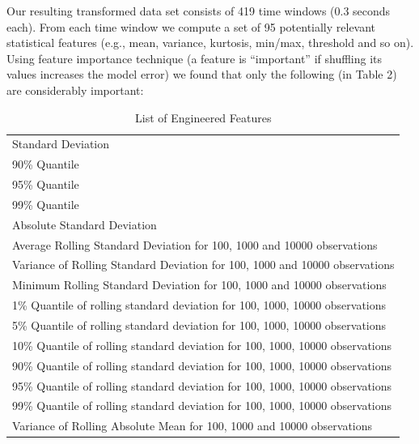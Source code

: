 \documentclass[]{llncs} %
\begin{document}
Our resulting transformed data set consists of 419 time windows (0.3 seconds each).  From each time window we compute a set of 95 potentially relevant statistical features (e.g., mean, variance, kurtosis, min/max, threshold and so on). Using feature importance technique (a feature is “important” if shuffling its values increases the model error) we found that only the following (in Table 2) are considerably important:
\begin{table}[H]
	\begin{center}
		\caption{List of Engineered Features}
		\label{tab:engineeredFeatrures}
		\begin{tabular}{l} 
Standard Deviation \\
90\% Quantile \\
95\% Quantile \\
99\% Quantile \\
Absolute Standard Deviation \\
Average Rolling Standard Deviation for 100, 1000 and 10000 observations \\
Variance of Rolling Standard Deviation for 100, 1000 and 10000 observations \\
Minimum Rolling Standard Deviation for 100, 1000 and 10000 observations \\
1\% Quantile of rolling standard deviation for 100, 1000, 10000 observations \\
5\% Quantile of rolling standard deviation for 100, 1000, 10000 observations \\
10\% Quantile of rolling standard deviation for 100, 1000, 10000 observations \\
90\% Quantile of rolling standard deviation for 100, 1000, 10000 observations \\
95\% Quantile of rolling standard deviation for 100, 1000, 10000 observations \\
99\% Quantile of rolling standard deviation for 100, 1000, 10000 observations \\
Variance of Rolling Absolute Mean for 100, 1000 and 10000 observations \\
		\end{tabular}
	\end{center}
\end{table}
\end{document}
